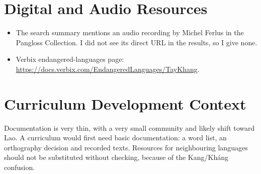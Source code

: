 \documentclass[12pt]{article}
\begin{document}
\section{Digital and Audio Resources}
\begin{itemize}
\item The search summary mentions an audio recording by Michel Ferlus in the Pangloss Collection. I did not see its direct URL in the results, so I give none.
\item Verbix endangered-languages page: \url{https://docs.verbix.com/EndangeredLanguages/TayKhang}.
\end{itemize}

\section{Curriculum Development Context}
Documentation is very thin, with a very small community and likely shift toward Lao. A curriculum would first need basic documentation: a word list, an orthography decision and recorded texts. Resources for neighbouring languages should not be substituted without checking, because of the Kang/Kh\'ang confusion.
\end{document}
